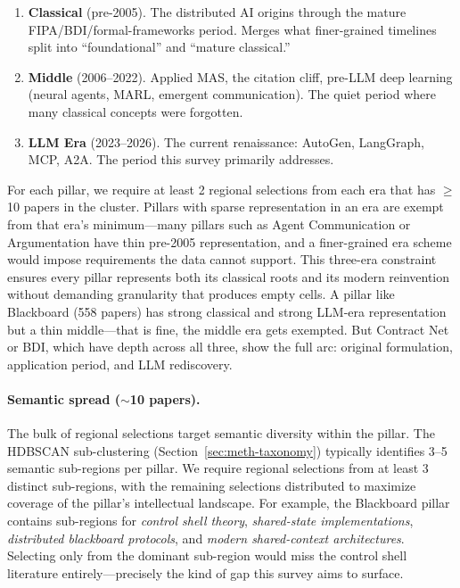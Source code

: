 \documentclass{article}
\begin{document}
\begin{enumerate}[label=\textbf{Era \arabic*}:, leftmargin=2.5cm, itemsep=2pt]
  \item \textbf{Classical} (pre-2005). The distributed AI origins through the mature
    FIPA/BDI/formal-frameworks period. Merges what finer-grained timelines split into
    ``foundational'' and ``mature classical.''
  \item \textbf{Middle} (2006--2022). Applied MAS, the citation cliff, pre-LLM deep
    learning (neural agents, MARL, emergent communication). The quiet period where many
    classical concepts were forgotten.
  \item \textbf{LLM Era} (2023--2026). The current renaissance: AutoGen, LangGraph,
    MCP, A2A. The period this survey primarily addresses.
\end{enumerate}

\noindent
For each pillar, we require at least 2 regional selections from each era that has
$\geq$10 papers in the cluster. Pillars with sparse representation in an era
are exempt from that era's minimum---many pillars such as Agent Communication
or Argumentation have thin pre-2005 representation, and a finer-grained era
scheme would impose requirements the data cannot support.
This three-era constraint ensures every pillar represents both its classical
roots and its modern reinvention without demanding granularity that produces
empty cells. A pillar like Blackboard (558 papers) has strong classical and
strong LLM-era representation but a thin middle---that is fine, the middle
era gets exempted. But Contract Net or BDI, which have depth across all three,
show the full arc: original formulation, application period, and LLM rediscovery.

\paragraph{Semantic spread ($\sim$10 papers).}
The bulk of regional selections target semantic diversity within the pillar.
The HDBSCAN sub-clustering (Section~\ref{sec:meth-taxonomy}) typically identifies
3--5 semantic sub-regions per pillar. We require regional selections from at least
3 distinct sub-regions, with the remaining selections distributed to maximize
coverage of the pillar's intellectual landscape. For example, the
Blackboard pillar contains sub-regions for \emph{control shell theory},
\emph{shared-state implementations}, \emph{distributed blackboard protocols}, and
\emph{modern shared-context architectures}. Selecting only from the dominant
sub-region would miss the control shell literature entirely---precisely the kind
of gap this survey aims to surface.
\end{document}
